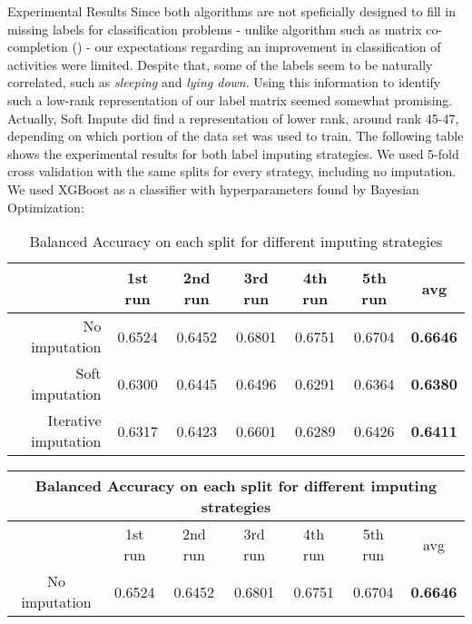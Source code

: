 \begin{subsection}{Experimental Results}
	Since both algorithms are not speficially designed to fill in missing labels for classification problems - unlike algorithm such as matrix co-completion (\cite{Xu18}) - our expectations regarding an improvement in classification of activities were limited. Despite that, some of the labels seem to be naturally correlated, such as \emph{sleeping} and \emph{lying down}. Using this information to identify such a low-rank representation of our label matrix seemed somewhat promising. Actually, Soft Impute did find a representation of lower rank, around rank 45-47, depending on which portion of the data set was used to train. The following table shows the experimental results for both label imputing strategies. We used 5-fold cross validation with the same splits for every strategy, including no imputation. We used XGBoost as a classifier with hyperparameters found by Bayesian Optimization:
	\begin{table}[H]
		\begin{center}
		\begin{tabular}{r||c|c|c|c|c|c}
			\toprule
			& 1st run &2nd run &3rd run& 4th run & 5th run & avg\\
			\midrule
			No imputation&0.6524&0.6452&0.6801&0.6751&0.6704&\textbf{0.6646}\\
			
			Soft imputation&0.6300&0.6445&0.6496&0.6291&0.6364&\textbf{0.6380}\\
			Iterative imputation&0.6317&0.6423&0.6601&0.6289&0.6426&\textbf{0.6411}\\
			\bottomrule
		\end{tabular}
		\caption{Balanced Accuracy on each split for different imputing strategies}
\end{center}	
\end{table}
	\begin{center}
		\begin{tabular}{ |c||c|c|c|c|c|c|  }
			\hline
			\multicolumn{7}{|c|}{Balanced Accuracy on each split for different imputing strategies} \\
			\hline
			& 1st run &2nd run &3rd run& 4th run & 5th run & avg\\
			\hline
			No imputation&0.6524&0.6452&0.6801&0.6751&0.6704&\textbf{0.6646}\\


\end{tabular}
\end{center}
\end{subsection}
